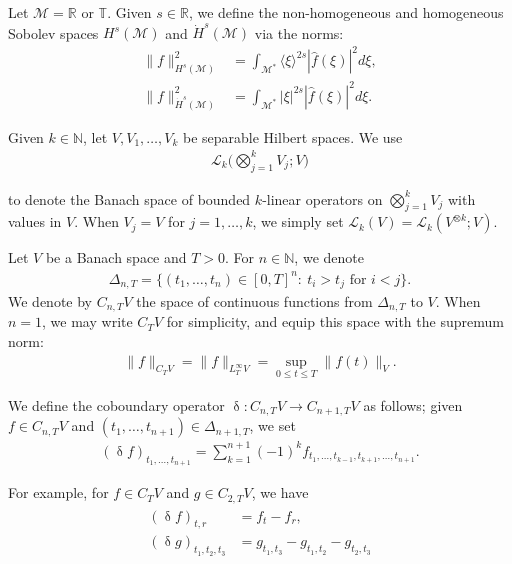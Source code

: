 \documentclass[letterpaper, 11pt,  reqno]{amsart}
\newcommand{\1}{\hspace{0.5mm}\text{I}\hspace{0.5mm}}
\newcommand{\noi}{\noindent}
\newcommand{\R}{\mathbb{R}}
\newcommand{\T}{\mathbb{T}}
\newcommand{\updl}{\updelta}
\newcommand{\Dl}{\Delta}
\newcommand{\ft}{\widehat}
\newcommand{\jb}[1]
{\langle #1 \rangle}
\newcommand{\M}{\mathcal{M}}
\newcommand{\N}{\mathbb{N}}
\newcommand{\cL}{\mathcal{L}}
\numberwithin{equation}{section}
\numberwithin{theorem}{section}
\begin{document}
Let $\M = \R$ or $\T$.
Given $s \in \R$, 
we define the non-homogeneous and homogeneous Sobolev spaces $H^{s}(\M)$ 
and $\dot H^{s}(\M)$ 
via the norms: 
\begin{align*}
\|  f  \|^2_{H^{s}(\M)}
& =
 \int_{\M^*} \jb{\xi}^{2s} |\ft f( \xi)|^2 d\xi, \\
\|  f  \|^2_{\dot H^{s}(\M)}
&  =
 \int_{\M^*} |\xi|^{2s} |\ft f( \xi)|^2 d\xi.
\end{align*}








Given $k \in \N$, 
let $V, V_1, \dots, V_k$  be separable Hilbert spaces.
We use 
\begin{align*}
\cL_k\Big(\bigotimes_{j = 1}^k V_j; V\Big)
\end{align*}

\noi
 to denote 
the Banach space of bounded $k$-linear operators 
on $\bigotimes_{j = 1}^k V_j$ 
with values in $V$.
When $V_j =  V$ for $j =1, \dots,k$,
we simply set  
 $\cL_k(V)=\cL_k(V^{\otimes k}; V)$. 






Let $V$ be a Banach space and $T>0$.
For $n\in\N$, we denote 
\begin{align*}
\Delta_{n, T} = 
\big\{ (t_1, \ldots, t_n) \in [0,T]^n: \ t_i > t_j 
\text{ for } i < j\big\}.
\end{align*}
We denote by $C_{n,T}V$ 
the space of continuous functions 
from $\Delta_{n,T}$ to $V$. When $n=1$,
we may write $C_T V$ for simplicity, 
and equip this space with the supremum norm: 
\begin{align*}
\|f\|_{C_T V} = \|f\|_{L^\infty_T V} = \sup_{0\leq t \leq T} \|f(t)\|_V.
\end{align*}



\noi
We define the coboundary operator 
$\updl: C_{n,T} V  \to C_{n+1,T} V$ 
as follows; 
given  $f\in C_{n,T} V$ 
and $(t_1,\ldots, t_{n+1}) \in \Dl_{{n+1},T}$, 
we set
\begin{align*}
(\updl f)_{t_1,\ldots , t_{n+1}} = 
\sum_{k=1}^{n+1} (-1)^{k} f_{t_1, \ldots, t_{k-1}, t_{k+1}, \ldots, t_{n+1}}.
\end{align*}



\noi
For example, for $f\in C_T V$
and 
$g\in C_{2,T} V$, 
we have 
\begin{align}
\begin{split}
(\updl f )_{t,r} &= f_t - f_r, \\
(\updl g)_{t_1,t_2,t_3} &= 
g_{t_1,t_3} - g_{t_1,t_2} - g_{t_2,t_3}
\end{split}
\label{dl1}
\end{align}
\end{document}
